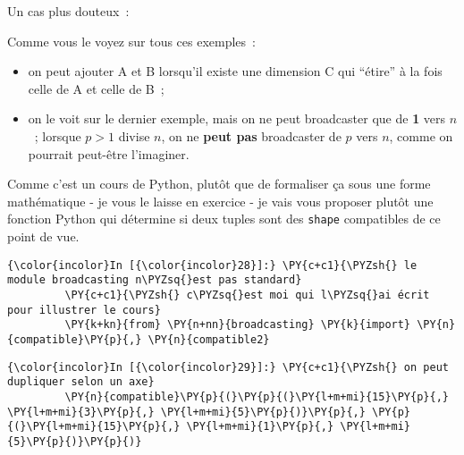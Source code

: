     Un cas plus douteux~:

\begin{Shaded}
\begin{Highlighting}[frame=lines,framerule=0.6mm,rulecolor=\color{asisframecolor}]
\end{Highlighting}
\end{Shaded}

    Comme vous le voyez sur tous ces exemples~:

\begin{itemize}
\item
  on peut ajouter A et B lorsqu'il existe une dimension C qui ``étire''
  à la fois celle de A et celle de B~;
\item
  on le voit sur le dernier exemple, mais on ne peut broadcaster que de
  \textbf{1} vers \(n\)~; lorsque \(p>1\) divise \(n\), on ne
  \textbf{peut pas} broadcaster de \(p\) vers \(n\), comme on pourrait
  peut-être l'imaginer.
\end{itemize}

    Comme c'est un cours de Python, plutôt que de formaliser ça sous une
forme mathématique - je vous le laisse en exercice - je vais vous
proposer plutôt une fonction Python qui détermine si deux tuples sont
des \texttt{shape} compatibles de ce point de vue.

    \begin{Verbatim}[commandchars=\\\{\},frame=single,framerule=0.3mm,rulecolor=\color{cellframecolor}]
{\color{incolor}In [{\color{incolor}28}]:} \PY{c+c1}{\PYZsh{} le module broadcasting n\PYZsq{}est pas standard}
         \PY{c+c1}{\PYZsh{} c\PYZsq{}est moi qui l\PYZsq{}ai écrit pour illustrer le cours}
         \PY{k+kn}{from} \PY{n+nn}{broadcasting} \PY{k}{import} \PY{n}{compatible}\PY{p}{,} \PY{n}{compatible2}
\end{Verbatim}


    \begin{Verbatim}[commandchars=\\\{\},frame=single,framerule=0.3mm,rulecolor=\color{cellframecolor}]
{\color{incolor}In [{\color{incolor}29}]:} \PY{c+c1}{\PYZsh{} on peut dupliquer selon un axe}
         \PY{n}{compatible}\PY{p}{(}\PY{p}{(}\PY{l+m+mi}{15}\PY{p}{,} \PY{l+m+mi}{3}\PY{p}{,} \PY{l+m+mi}{5}\PY{p}{)}\PY{p}{,} \PY{p}{(}\PY{l+m+mi}{15}\PY{p}{,} \PY{l+m+mi}{1}\PY{p}{,} \PY{l+m+mi}{5}\PY{p}{)}\PY{p}{)}
\end{Verbatim}


